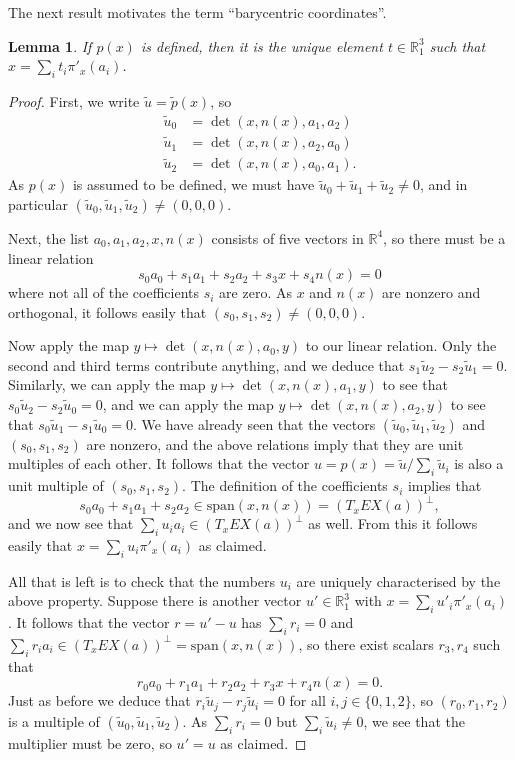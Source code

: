 \documentclass[reqno]{amsart}
\newcommand{\R}         {{\mathbb{R}}}
\newcommand{\tu}	{\widetilde{u}}
\renewcommand{\:}{\colon}
\newtheorem{lemma}[theorem]{Lemma}
\theoremstyle{definition}
\begin{document}
The next result motivates the term ``barycentric coordinates''.
\begin{lemma}
 If $p(x)$ is defined, then it is the unique element $t\in\R^3_1$ such
 that $x=\sum_it_i\pi'_x(a_i)$.
\end{lemma}
\begin{proof}
 First, we write $\tu=\widetilde{p}(x)$, so
 \begin{align*}
  \tu_0 &= \det(x,n(x),a_1,a_2) \\
  \tu_1 &= \det(x,n(x),a_2,a_0) \\
  \tu_2 &= \det(x,n(x),a_0,a_1).
 \end{align*}
 As $p(x)$ is assumed to be defined, we must have
 $\tu_0+\tu_1+\tu_2\neq 0$, and in particular
 $(\tu_0,\tu_1,\tu_2)\neq(0,0,0)$.

 Next, the list $a_0,a_1,a_2,x,n(x)$ consists of five vectors in
 $\R^4$, so there must be a linear relation
 \[ s_0a_0 + s_1a_1 + s_2a_2 + s_3x + s_4n(x) = 0 \]
 where not all of the coefficients $s_i$ are zero.  As $x$ and $n(x)$
 are nonzero and orthogonal, it follows easily that
 $(s_0,s_1,s_2)\neq(0,0,0)$.

 Now apply the map $y\mapsto\det(x,n(x),a_0,y)$ to our linear
 relation.  Only the second and third terms contribute anything, and
 we deduce that $s_1\tu_2-s_2\tu_1=0$.  Similarly, we can apply the
 map $y\mapsto\det(x,n(x),a_1,y)$ to see that $s_0\tu_2-s_2\tu_0=0$,
 and we can apply the map $y\mapsto\det(x,n(x),a_2,y)$ to see that
 $s_0\tu_1-s_1\tu_0=0$.  We have already seen that the vectors
 $(\tu_0,\tu_1,\tu_2)$ and $(s_0,s_1,s_2)$ are nonzero, and the above
 relations imply that they are unit multiples of each other.  It
 follows that the vector $u=p(x)=\tu/\sum_i\tu_i$ is also a unit
 multiple of $(s_0,s_1,s_2)$.  The definition of the coefficients
 $s_i$ implies that
 \[ s_0a_0+s_1a_1+s_2a_2\in\text{span}(x,n(x)) = (T_xEX(a))^\perp, \]
 and we now see that $\sum_iu_ia_i\in(T_xEX(a))^\perp$ as well.  From this
 it follows easily that $x=\sum_iu_i\pi'_x(a_i)$ as claimed.

 All that is left is to check that the numbers $u_i$ are uniquely
 characterised by the above property.  Suppose there is another
 vector $u'\in\R^3_1$ with $x=\sum_iu'_i\pi'_x(a_i)$.  It
 follows that the vector $r=u'-u$ has $\sum_ir_i=0$ and
 $\sum_ir_ia_i\in(T_xEX(a))^\perp=\text{span}(x,n(x))$, so there exist
 scalars $r_3,r_4$ such that
 \[ r_0a_0 + r_1a_1 + r_2a_2 + r_3x + r_4n(x) = 0. \]
 Just as before we deduce that $r_i\tu_j-r_j\tu_i=0$ for all
 $i,j\in\{0,1,2\}$, so $(r_0,r_1,r_2)$ is a multiple of
 $(\tu_0,\tu_1,\tu_2)$.  As $\sum_ir_i=0$ but $\sum_i\tu_i\neq 0$, we
 see that the multiplier must be zero, so $u'=u$ as claimed.
\end{proof}
\end{document}
